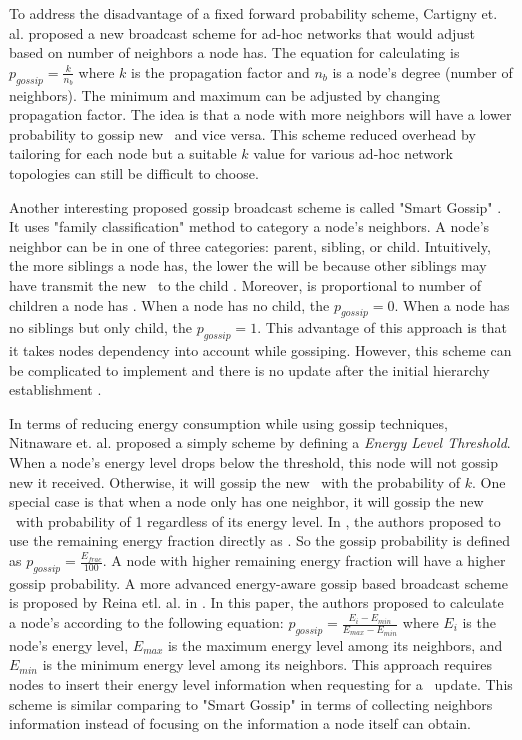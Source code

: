 To address the disadvantage of a fixed forward probability scheme, Cartigny et. al. \cite{cartigny2003border} proposed a new broadcast scheme for ad-hoc networks that would adjust \emph{\pog} based on number of neighbors a node has. The equation for calculating \emph{\pog} is $p_{gossip}=\frac{k}{n_b}$ where $k$ is the propagation factor and $n_b$ is a node's degree (number of neighbors). The minimum and maximum \emph{\pog} can be adjusted by changing propagation factor. The idea is that a node with more neighbors will have a lower probability to gossip new \msgs ~and vice versa. This scheme reduced overhead by tailoring \emph{\pog} for each node but a suitable $k$ value for various ad-hoc network topologies can still be difficult to choose. 

Another interesting proposed gossip broadcast scheme is called "Smart Gossip" \cite{smart}. It uses "family classification" method to category a node's neighbors. A node's neighbor can be in one of three categories: parent, sibling, or child. Intuitively, the more siblings a node has, the lower the \emph{\pog} will be because other siblings may have transmit the new \msg ~to the child \cite{2015survey}. Moreover, \emph{\pog} is proportional to number of children a node has \cite{2015survey}. When a node has no child, the $p_{gossip}=0$. When a node has no siblings but only child, the $p_{gossip}=1$. This advantage of this approach is that it takes nodes dependency into account while gossiping. However, this scheme can be complicated to implement and there is no update after the initial hierarchy establishment \cite{2015survey}.

In terms of reducing energy consumption while using gossip techniques, Nitnaware et. al. \cite{nitnaware2009performance} proposed a simply scheme by defining a \emph{Energy Level Threshold}. When a node's energy level drops below the threshold, this node will not gossip new \msgs it received. Otherwise, it will gossip the new \msg ~with the probability of $k$. One special case is that when a node only has one neighbor, it will gossip the new \msg ~with probability of 1 regardless of its energy level. In \cite{nitnaware2010energy}, the authors proposed to use the remaining energy fraction directly as \emph{\pog}. So the gossip probability is defined as $p_{gossip}=\frac{E_{frac}}{100}$. A node with higher remaining energy fraction will have a higher gossip probability. A more advanced energy-aware gossip based broadcast scheme is proposed by Reina etl. al. in \cite{reina2012optimization}. In this paper, the authors proposed to calculate a node's \emph{\pog} according to the following equation: $p_{gossip}=\frac{E_i - E_{min}}{E_{max}-E_{min}}$ where $E_i$ is the node's energy level, $E_{max}$ is the maximum energy level among its neighbors, and $E_{min}$ is the minimum energy level among its neighbors. This approach requires nodes to insert their energy level information when requesting for a \msg ~update. This scheme is similar comparing to "Smart Gossip" in terms of collecting neighbors information instead of focusing on the information a node itself can obtain. 

